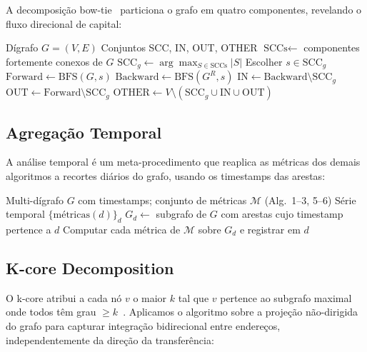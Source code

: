 \documentclass[12pt,a4paper]{article}
\begin{document}
A decomposição bow-tie~\cite{broder2000} particiona o grafo em quatro componentes, revelando o fluxo direcional de capital:

\begin{algorithm}[H]
\caption{Decomposição Bow-Tie}
\begin{algorithmic}[1]
\Require Dígrafo $G = (V, E)$
\Ensure Conjuntos SCC, IN, OUT, OTHER
\State $\text{SCCs} \gets$ componentes fortemente conexos de $G$
\State $\text{SCC}_g \gets \arg\max_{S \in \text{SCCs}} |S|$
\State Escolher $s \in \text{SCC}_g$
\State $\text{Forward} \gets \text{BFS}(G, s)$ 
\State $\text{Backward} \gets \text{BFS}(G^R, s)$ 
\State $\text{IN} \gets \text{Backward} \setminus \text{SCC}_g$
\State $\text{OUT} \gets \text{Forward} \setminus \text{SCC}_g$
\State $\text{OTHER} \gets V \setminus (\text{SCC}_g \cup \text{IN} \cup \text{OUT})$
\end{algorithmic}
\end{algorithm}

\subsection{Agregação Temporal}

A análise temporal é um meta-procedimento que reaplica as métricas dos demais algoritmos a recortes diários do grafo, usando os timestamps das arestas:

\begin{algorithm}[H]
\caption{Agregação Temporal de Métricas}
\begin{algorithmic}[1]
\Require Multi-dígrafo $G$ com timestamps; conjunto de métricas $\mathcal{M}$ (Alg.\ 1--3, 5--6)
\Ensure Série temporal $\{\text{métricas}(d)\}_d$
  \State $G_d \gets$ subgrafo de $G$ com arestas cujo timestamp pertence a $d$
  \State Computar cada métrica de $\mathcal{M}$ sobre $G_d$ e registrar em $d$
\EndFor
\end{algorithmic}
\end{algorithm}

\subsection{K-core Decomposition}

O k-core atribui a cada nó $v$ o maior $k$ tal que $v$ pertence ao subgrafo maximal onde todos têm grau $\geq k$~\cite{batagelj2003}. Aplicamos o algoritmo sobre a projeção não-dirigida do grafo para capturar integração bidirecional entre endereços, independentemente da direção da transferência:
\end{document}
